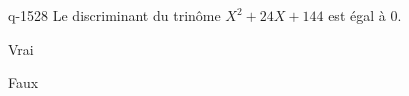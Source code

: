 \begin{truefalse}{q-1528}
Le discriminant du trinôme $X^2+24X+144$ est égal à $0$.
\item* Vrai
\item Faux
\end{truefalse}

